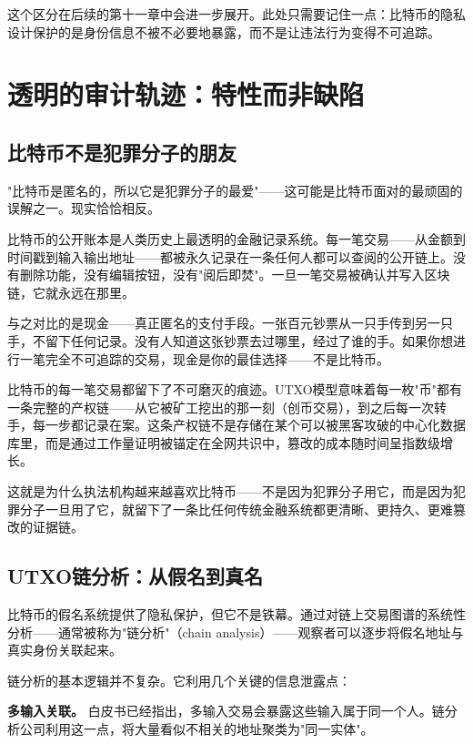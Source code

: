 \documentclass[a4paper,12pt,openany]{ctexbook}
\begin{document}
这个区分在后续的第十一章中会进一步展开。此处只需要记住一点：比特币的隐私设计保护的是身份信息不被不必要地暴露，而不是让违法行为变得不可追踪。


\section*{透明的审计轨迹：特性而非缺陷}



\subsection*{比特币不是犯罪分子的朋友}


"比特币是匿名的，所以它是犯罪分子的最爱"——这可能是比特币面对的最顽固的误解之一。现实恰恰相反。

比特币的公开账本是人类历史上最透明的金融记录系统。每一笔交易——从金额到时间戳到输入输出地址——都被永久记录在一条任何人都可以查阅的公开链上。没有删除功能，没有编辑按钮，没有"阅后即焚"。一旦一笔交易被确认并写入区块链，它就永远在那里。

与之对比的是现金——真正匿名的支付手段。一张百元钞票从一只手传到另一只手，不留下任何记录。没有人知道这张钞票去过哪里，经过了谁的手。如果你想进行一笔完全不可追踪的交易，现金是你的最佳选择——不是比特币。

比特币的每一笔交易都留下了不可磨灭的痕迹。UTXO模型意味着每一枚"币"都有一条完整的产权链——从它被矿工挖出的那一刻（创币交易），到之后每一次转手，每一步都记录在案。这条产权链不是存储在某个可以被黑客攻破的中心化数据库里，而是通过工作量证明被锚定在全网共识中，篡改的成本随时间呈指数级增长。

这就是为什么执法机构越来越喜欢比特币——不是因为犯罪分子用它，而是因为犯罪分子一旦用了它，就留下了一条比任何传统金融系统都更清晰、更持久、更难篡改的证据链。


\subsection*{UTXO链分析：从假名到真名}


比特币的假名系统提供了隐私保护，但它不是铁幕。通过对链上交易图谱的系统性分析——通常被称为"链分析"（chain analysis）——观察者可以逐步将假名地址与真实身份关联起来。

链分析的基本逻辑并不复杂。它利用几个关键的信息泄露点：

\textbf{多输入关联。} 白皮书已经指出，多输入交易会暴露这些输入属于同一个人。链分析公司利用这一点，将大量看似不相关的地址聚类为"同一实体"。
\end{document}
